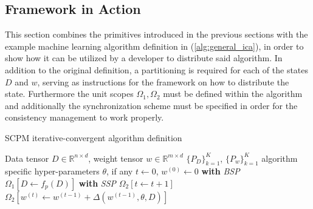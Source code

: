 \subsection{Framework in Action}
This section combines the primitives introduced in the previous sections with the example machine learning algorithm definition in (\ref{alg:general_ica}), in order to show how it can be utilized by a developer to distribute said algorithm.
In addition to the original definition, a partitioning is required for each of the states $D$ and $w$, serving as instructions for the framework on how to distribute the state.
Furthermore the unit scopes $\Omega_1, \Omega_2$ must be defined within the algorithm and additionally the synchronization scheme must be specified in order for the consistency management to work properly.
\begin{algorithm}
\caption{SCPM iterative-convergent algorithm definition}\label{alg:scpm_ica}
\begin{algorithmic}[1]{}
\ALGSTATE Data tensor $D \in \mathbb{R}^{n \times d}$, weight tensor $w \in \mathbb{R}^{m \times d}$
\PARTITIONING $\{P_D\}_{k=1}^K$, $\{P_w\}_{k=1}^K$
\INPUT algorithm specific hyper-parameters $\theta$, if any
\INIT $t \gets 0$, $w^{(0)} \gets 0$
\State \textbf{with} \textit{BSP}
\State \hspace{\algorithmicindent} $\Omega_1[D \gets f_{p}(D)]$
\Repeat
\State \textbf{with} \textit{SSP}
\State \hspace{\algorithmicindent} $\Omega_2[t \gets t + 1]$
\State \hspace{\algorithmicindent} $\Omega_2[w^{(t)} \gets w^{(t-1)} + \Delta(w^{(t-1)}, \theta, D)]$
\end{algorithmic}
\end{algorithm}


